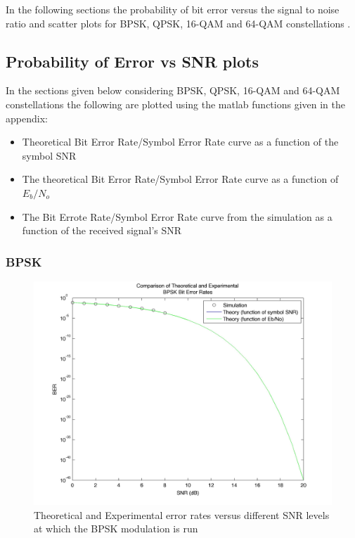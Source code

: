 \documentclass[]{article}
\begin{document}
In the following sections the probability of bit error versus the signal to noise ratio and scatter plots for BPSK, QPSK, 16-QAM and 64-QAM constellations .

\subsection{Probability of Error vs SNR plots}
In the sections given below considering BPSK, QPSK, 16-QAM and 64-QAM constellations the following  are plotted using the matlab functions given in the appendix:
\begin{itemize}
\item Theoretical Bit Error Rate/Symbol Error Rate curve as a function of the symbol SNR
\item The theoretical Bit Error Rate/Symbol Error Rate curve as a function of $E_b/N_o$
\item The Bit Errote Rate/Symbol Error Rate curve from the simulation as a function of the received signal's SNR
\end{itemize}

\subsubsection{BPSK}
\begin{figure}[H]
\centering
\hspace*{-2cm}\includegraphics[width=1.3\textwidth]{bpSNR.jpg}
\caption{Theoretical and Experimental error rates versus different SNR levels at which the BPSK modulation is run }
\end{figure}
\end{document}
